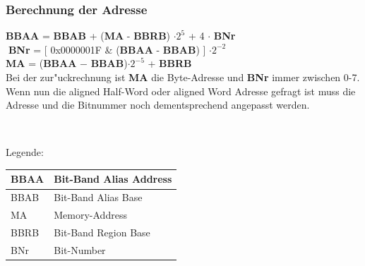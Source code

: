 \subsubsection{Berechnung der Adresse}
\begin{minipage}{12cm}
	\vspace{-2ex}
	\textbf{BBAA} = \textbf{BBAB} + (\textbf{MA} - \textbf{BBRB}) $\cdot 2^5$ + 4 $\cdot$ \textbf{BNr}\\
	\textbf{BNr} = [ 0x0000001F \& (\textbf{BBAA} - \textbf{BBAB}) ] $\cdot 2^{-2}$\\
	\textbf{MA} = (\textbf{BBAA} $-$ \textbf{BBAB})$\cdot 2^{-5}$ + \textbf{BBRB}\\
	
	Bei der zur"uckrechnung ist \textbf{MA} die Byte-Adresse und \textbf{BNr} immer zwischen 0-7. Wenn nun die aligned Half-Word oder aligned Word Adresse gefragt ist muss die Adresse und die Bitnummer noch dementsprechend angepasst werden.
\end{minipage}
%
\begin{minipage}{0.5cm}
	\-\
\end{minipage}
%
\begin{minipage}{6cm}
	Legende:
	\begin{tabular}{|l|l|}
		\hline
		BBAA & Bit-Band Alias Address\\\hline
		BBAB & Bit-Band Alias Base \\\hline
		MA & Memory-Address \\\hline
		BBRB & Bit-Band Region Base\\\hline
		BNr & Bit-Number\\\hline
	\end{tabular}
\end{minipage}